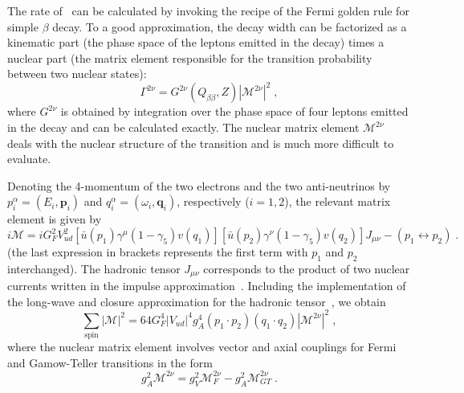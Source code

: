 The rate of \nnbb\ can be calculated by invoking the recipe of the Fermi golden
rule for simple $\beta$ decay. To a good approximation, the decay width can be
factorized as a kinematic part (the phase space of the leptons emitted in the
decay) times a nuclear part (the matrix element responsible for the transition
probability between two nuclear states):
\[
  \Gamma^{2\nu} = G^{2\nu}(Q_{\beta\beta},Z) |\mathcal{M}^{2\nu}|^2 \;,
\]
where $G^{2\nu}$ is obtained by integration over the phase space of four
leptons emitted in the decay and can be calculated exactly. The nuclear matrix
element $\mathcal{M}^{2\nu}$ deals with the nuclear structure of the transition
and is much more difficult to evaluate.

Denoting the 4-momentum of the two electrons and the two anti-neutrinos by
$p^\alpha_i=(E_i,\mathbf{p}_i)$ and $q^\alpha_i=(\omega_i,\mathbf{q}_i)$,
respectively ($i=1,2$), the relevant matrix element is given by
\[
  i\mathcal{M} = iG^2_F V^2_{ud} [\bar{u}(p_1) \gamma^\mu (1-\gamma_5) v(q_1)]
                 [\bar{u}(p_2) \gamma^\nu (1-\gamma_5) v(q_2)] J_{\mu\nu} -
                 (p_1\leftrightarrow p_2) \;.
               \]
(the last expression in brackets represents the first term with $p_1$ and $p_2$
interchanged).  The hadronic tensor $J_{\mu\nu}$ corresponds to the product of
two nuclear currents written in the impulse approximation~\cite{Tomoda1991}.
Including the implementation of the long-wave and closure approximation for the
hadronic tensor~\cite{Tomoda1991}, we obtain
\[
  \sum_\text{spin} |\mathcal{M}|^2 = 64 G^4_F |V_{ud}|^4 g^4_A (p_1 \cdot p_2)
                                     (q_1 \cdot q_2) |\mathcal{M}^{2\nu}|^2 \;,
\]
where the nuclear matrix element involves vector and axial couplings for Fermi
and Gamow-Teller transitions in the form
\[
  g^2_A\mathcal{M}^{2\nu} = g^2_V \mathcal{M}^{2\nu}_F -
                            g^2_A \mathcal{M}^{2\nu}_{GT} \;.
\]

